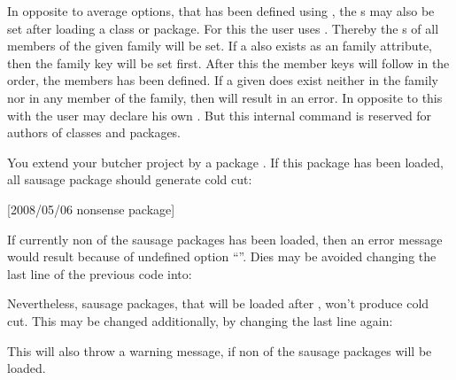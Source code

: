 In opposite to average options, that has been defined using
, the s may also be set after loading a class
or package. For this the user uses . Thereby the
s of all members of the given family will be set. If a 
also exists as an family attribute, then the family key will be set
first. After this the member keys will follow in the order, the members has
been defined. If a given  does exist neither in the family nor in
any member of the family, then  will result in an
error. In opposite to this with  the user may declare
his own . But this internal command is reserved for
authors of classes and packages.
\begin{Example}
  You extend your butcher project by a package . If this
  package has been loaded, all sausage package should generate cold cut:
\begin{lstcode}
                  [2008/05/06 nonsense package]
  \relax
\end{lstcode}
  If currently non of the sausage packages has been loaded, then an error
  message would result because of undefined option ``''. Dies
  may be avoided changing the last line of the previous code into:
\begin{lstcode}[moretexcs={Family@Options}]
\end{lstcode}
  Nevertheless, sausage packages, that will be loaded after
  , won't produce cold cut. This may be changed
  additionally, by changing the last line again:
\begin{lstcode}[moretexcs={Family@Options}]
\end{lstcode}
  This will also throw a warning message, if non of the sausage packages will
  be loaded.
\end{Example}
%
%
%


